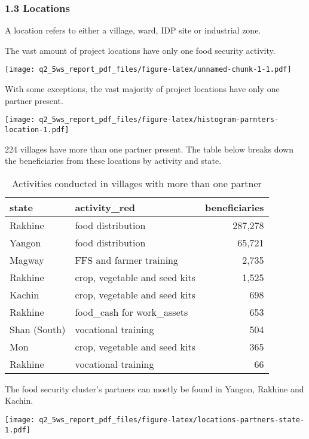 \documentclass[
]{article}
\begin{document}
\hypertarget{locations}{%
\subsubsection{1.3 Locations}\label{locations}}

A location refers to either a village, ward, IDP site or industrial
zone.

The vast amount of project locations have only one food security
activity.

\texttt{[image: q2\_5ws\_report\_pdf\_files/figure-latex/unnamed-chunk-1-1.pdf]}

With some exceptions, the vast majority of project locations have only
one partner present.

\texttt{[image: q2\_5ws\_report\_pdf\_files/figure-latex/histogram-parnters-location-1.pdf]}

224 villages have more than one partner present. The table below breaks
down the beneficiaries from these locations by activity and state.

\begin{table}

\caption{\label{tab:table-more-than-one-partner}Activities conducted in villages with more than one partner}
\centering
\begin{tabular}[t]{l|l|r}
\hline
state & activity\_red & beneficiaries\\
\hline
Rakhine & food distribution & 287,278\\
\hline
Yangon & food distribution & 65,721\\
\hline
Magway & FFS and farmer training & 2,735\\
\hline
Rakhine & crop, vegetable and seed kits & 1,525\\
\hline
Kachin & crop, vegetable and seed kits & 698\\
\hline
Rakhine & food\_cash for work\_assets & 653\\
\hline
Shan (South) & vocational training & 504\\
\hline
Mon & crop, vegetable and seed kits & 365\\
\hline
Rakhine & vocational training & 66\\
\hline
\end{tabular}
\end{table}

The food security cluster's partners can mostly be found in Yangon,
Rakhine and Kachin.

\texttt{[image: q2\_5ws\_report\_pdf\_files/figure-latex/locations-partners-state-1.pdf]}
\end{document}
